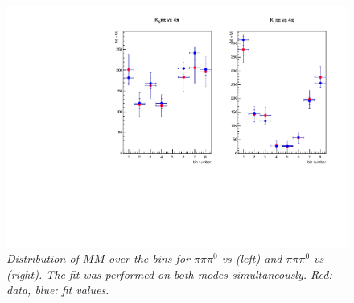 \begin{figure}[!h]
	\vspace*{-0.5cm}
	\begin{center}
	 \includegraphics[width=0.96 \textwidth] {F_pipipi0_both.pdf}
		\vspace*{-0.5cm}
	\end{center}
	\caption{\textit{Distribution of $MM$ over the bins for $\pi \pi \pi^0$ vs \KsPiPi (left) and $\pi \pi \pi^0$ vs \KlPiPi (right). The fit was performed on both modes simultaneously. Red: data, blue: fit values. }}
\end{figure}\\
\clearpage

